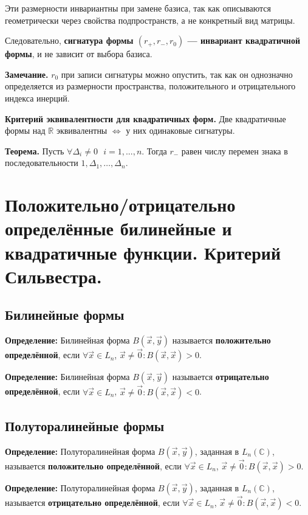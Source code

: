 \documentclass[12pt]{article}
\begin{document}
Эти размерности инвариантны при замене базиса, так как описываются геометрически через свойства подпространств, а не конкретный вид матрицы.

Следовательно, \textbf{сигнатура формы $(r_+, r_-, r_0)$ — инвариант квадратичной формы}, и не зависит от выбора базиса.

\textbf{Замечание.} $r_0$ при записи сигнатуры можно опустить, так как он однозначно определяется из размерности пространства, положительного и отрицательного индекса инерций.

\textbf{Критерий эквивалентности для квадратичных форм.} Две квадратичные формы над $\mathbb{R}$ эквивалентны $\Leftrightarrow$ у них одинаковые сигнатуры.

\textbf{Теорема.} Пусть $\forall \Delta_i \ne 0 \ \ \ i =1,...,n$. Тогда $r_-$ равен числу перемен знака в последовательности $1, \Delta_1, \dots,\Delta_n$.

\section{Положительно/отрицательно определённые билинейные и квадратичные функции. Критерий Сильвестра.}

\subsection*{Билинейные формы}

\textbf{Определение:} Билинейная форма $B(\vec{x}, \vec{y})$ называется \textbf{положительно определённой}, если $\forall \vec{x} \in L_n$, $\vec{x} \neq \vec{0}: B(\vec{x}, \vec{x}) > 0$.

\textbf{Определение:} Билинейная форма $B(\vec{x}, \vec{y})$ называется \textbf{отрицательно определённой}, если $\forall \vec{x} \in L_n$, $\vec{x} \neq \vec{0}: B(\vec{x}, \vec{x}) < 0$.

\subsection*{Полуторалинейные формы}

\textbf{Определение:} Полуторалинейная форма $B(\vec{x}, \vec{y})$, заданная в $L_n(\mathbb{C})$, называется \textbf{положительно определённой}, если $\forall \vec{x} \in L_n$, $\vec{x} \neq \vec{0}: B(\vec{x}, \vec{x}) > 0$.



\textbf{Определение:} Полуторалинейная форма $B(\vec{x}, \vec{y})$, заданная в $L_n(\mathbb{C})$, называется \textbf{отрицательно определённой}, если $\forall \vec{x} \in L_n$, $\vec{x} \neq \vec{0}: B(\vec{x}, \vec{x}) < 0$.
\end{document}
